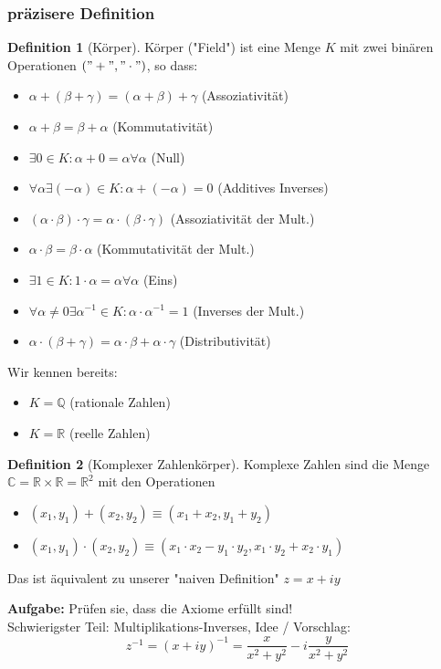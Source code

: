 \documentclass[a4paper]{scrartcl}
\DeclareMathOperator{\Exists}{\exists}
\DeclareMathOperator{\Forall}{\forall}
\theoremstyle{definition}
\newtheorem{defn}{Definition}
\theoremstyle{plain}
\theoremstyle{remark}
\theoremstyle{remark}
\newcommand{\I}{\ensuremath{i}}%
\begin{document}
\subsubsection{präzisere Definition}
\label{sec-5-1-3}
\begin{defn}[Körper]
Körper ("Field") ist eine Menge $K$ mit zwei binären Operationen $("+","\cdot")$, so dass:
\begin{itemize}
\item $\alpha + (\beta + \gamma) = (\alpha + \beta) + \gamma$ \hfill (Assoziativität)
\item $\alpha + \beta = \beta + \alpha$ \hfill (Kommutativität)
\item $\Exists 0 \in K: \alpha + 0 = \alpha \Forall \alpha$ \hfill (Null)
\item $\Forall \alpha \Exists (-\alpha) \in K: \alpha + (-\alpha) = 0$ \hfill (Additives Inverses)
\item $(\alpha \cdot \beta) \cdot \gamma = \alpha \cdot (\beta \cdot \gamma)$ \hfill (Assoziativität der Mult.)
\item $\alpha \cdot \beta = \beta \cdot \alpha$ \hfill (Kommutativität der Mult.)
\item $\Exists 1 \in K: 1\cdot \alpha = \alpha \Forall \alpha$ \hfill (Eins)
\item $\Forall \alpha \neq 0 \Exists \alpha^{-1} \in K: \alpha \cdot \alpha^{-1} = 1$ \hfill (Inverses der Mult.)
\item $\alpha\cdot (\beta + \gamma) = \alpha \cdot \beta + \alpha \cdot \gamma$ \hfill (Distributivität)
\end{itemize}
\end{defn}
Wir kennen bereits:
\begin{itemize}
\item $K = \mathbb{Q}$ \hfill (rationale Zahlen)
\item $K = \mathbb{R}$ \hfill (reelle Zahlen)
\end{itemize}
\begin{defn}[Komplexer Zahlenkörper]
Komplexe Zahlen sind die Menge $\mathbb{C} = \mathbb{R} \times \mathbb{R} = \mathbb{R}^2$ mit den Operationen
\begin{itemize}
\item $(x_1, y_1) + (x_2, y_2) \equiv (x_1 + x_2, y_1 + y_2)$
\item $(x_1, y_1) \cdot (x_2, y_2) \equiv (x_1 \cdot x_2 - y_1 \cdot y_2, x_1 \cdot y_2 + x_2 \cdot y_1)$
\end{itemize}
Das ist äquivalent zu unserer "naiven Definition" $z = x + \I y$
\end{defn}
\textbf{Aufgabe:} Prüfen sie, dass die Axiome erfüllt sind! \\
        Schwierigster Teil: Multiplikations-Inverses, Idee / Vorschlag:
\[z^{-1} = (x + \I y)^{-1} = \frac{x}{x^2 + y^2} - \I \frac{y}{x^2 + y^2}\]
\end{document}
